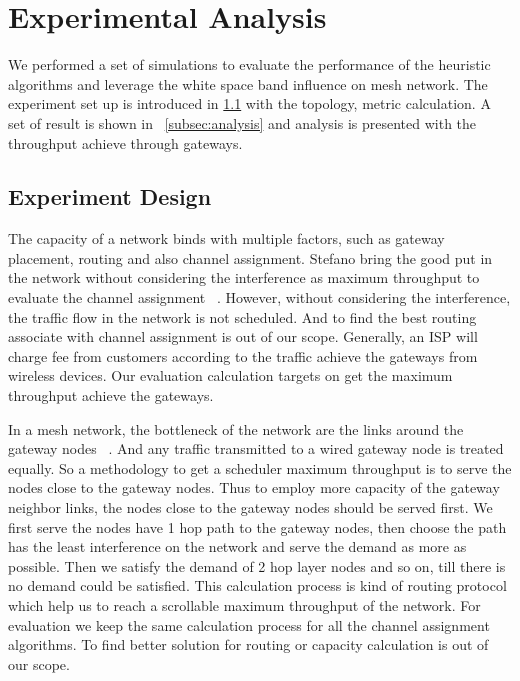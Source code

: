 \section{Experimental Analysis}
\label{sec:experimentdesign}

We performed a set of simulations to evaluate the performance of the heuristic algorithms and leverage the white space band influence on mesh network. 
The experiment set up is introduced in \ref{subsec:design} with the topology, metric calculation.
A set of result is shown in ~\ref{subsec:analysis} and analysis is presented with the throughput achieve through gateways.

\subsection{Experiment Design}
\label{subsec:design}

The capacity of a network binds with multiple factors, such as gateway placement, routing and also channel assignment. 
Stefano bring the good put in the network without considering the interference as maximum throughput to evaluate the channel assignment ~\cite{avallone2008channel}. 
However, without considering the interference, the traffic flow in the network is not scheduled.
And to find the best routing associate with channel assignment is out of our scope. 
Generally, an ISP will charge fee from customers according to the traffic achieve the gateways from wireless devices.
Our evaluation calculation targets on get the maximum throughput achieve the gateways.

In a mesh network, the bottleneck of the network are the links around the gateway nodes ~\cite{robinson2010deploying}. 
And any traffic transmitted to a wired gateway node is treated equally. So a methodology to get a scheduler maximum throughput is to serve the nodes close to the gateway nodes.
Thus to employ more capacity of the gateway neighbor links, the nodes close to the gateway nodes should be served first.
We first serve the nodes have 1 hop path to the gateway nodes, then choose the path has the least interference on the network and serve the demand as more as possible. Then we satisfy the demand of 2 hop layer nodes and so on, till there is no demand could be satisfied.
This calculation process is kind of routing protocol which help us to reach a scrollable maximum throughput of the network. For evaluation we keep the same calculation process for all the channel assignment algorithms. To find better solution for routing or capacity calculation is out of our scope.

